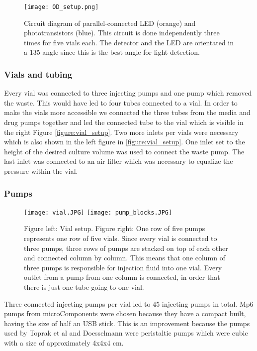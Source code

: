 \begin{figure}
	\texttt{[image: OD\_setup.png]}
	\caption{Circuit diagram of parallel-connected LED (orange) and phototransistors (blue). This circuit is done independently three times for five vials each. The detector and the LED are orientated in a 135 \degree  angle since this is the best angle for light detection.}
	\label{figure:OD_cirguit}
\end{figure}

\subsubsection{Vials and tubing}
Every vial was connected to three injecting pumps and one pump which removed the waste. This would have led to four tubes connected to a vial. In order to make the vials more accessible we connected the three tubes from the media and drug pumps together and led the connected tube to the vial which is visible in the right Figure \ref{figure:vial_setup}. Two more inlets per vials were necessary which is also shown in the left figure in \ref{figure:vial_setup}. One inlet set to the height of the desired culture volume was used to connect the waste pump. The last inlet was connected to an air filter which was necessary to equalize the pressure within the vial. 

\subsubsection{Pumps} 
\begin{figure}
	\texttt{[image: vial.JPG]}
	\texttt{[image: pump\_blocks.JPG]}
	\caption{Figure left: Vial setup. Figure right: One row of five pumps represents one row of five vials. Since every vial is connected to three pumps, three rows of pumps are stacked on top of each other and connected column by column. This means that one column of three pumps is responsible for injection fluid into one vial. Every outlet from a pump from one column is connected, in order that there is just one tube going to one vial. }
	\label{figure:tubing_setup}
\end{figure}
Three connected injecting pumps per vial led to 45 injecting pumps in total. Mp6 pumps from microComponents were chosen because they have a compact built, having the size of half an USB stick. This is an improvement because the pumps used by Toprak et al \cite{toprak_building_2013} and Doesselmann \cite{doselmann_rapid_2017} were peristaltic pumps which were cubic with a size of approximately 4x4x4 cm. 

